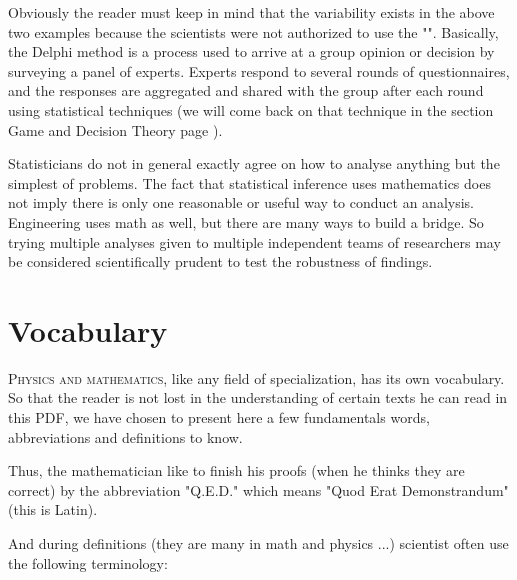 	Obviously the reader must keep in mind that the variability exists in the above two examples because the scientists were not authorized to use the "". Basically, the Delphi method is a process used to arrive at a group opinion or decision by surveying a panel of experts. Experts respond to several rounds of questionnaires, and the responses are aggregated and shared with the group after each round using statistical techniques (we will come back on that technique in the section Game and Decision Theory page \pageref{Delphi method}).
	
	\begin{tcolorbox}[enhanced,colback=red!5!white,colframe=black!50!red,boxrule=1pt,arc=0pt,outer arc=0pt,drop lifted shadow,after skip=10pt plus 2pt]
	\bcbombe Statisticians do not in general exactly agree on how to analyse anything but the simplest of problems. The fact that statistical inference uses mathematics does not imply there is only one reasonable or useful way to conduct an analysis. Engineering uses math as well, but there are many ways to build a bridge. So trying multiple analyses given to multiple independent teams of researchers may be considered scientifically prudent to test the robustness of findings.
	\end{tcolorbox}

	\newpage
	\thispagestyle{empty}
	\mbox{}
	\section{Vocabulary}
	\lettrine[lines=4]{\color{BrickRed}P}{hysics and mathematics}, like any field of specialization, has its own vocabulary. So that the reader is not lost in the understanding of certain texts he can read in this PDF, we have chosen to present here a few fundamentals words, abbreviations and definitions to know.
	
	Thus, the mathematician like to finish his proofs (when he thinks they are correct) by the abbreviation "Q.E.D." which means "Quod Erat Demonstrandum" (this is Latin).
	
	And during definitions (they are many in math and physics ...) scientist often use the following terminology:
	
